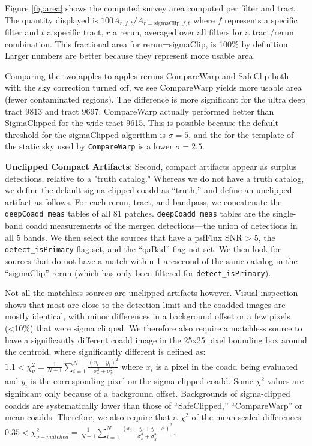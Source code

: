 \documentclass[DM,authoryear,toc]{lsstdoc}
\begin{document}
Figure \ref{fig:area} shows the computed survey area computed per filter and tract.
The quantity displayed is $100A_{r,f,t}/A_{r=\mathrm{sigmaClip}, f,t}$ where $f$ represents a specific filter and $t$ a specific tract, $r$ a rerun, averaged over all filters for a tract/rerun combination.  This fractional area for rerun=sigmaClip, is 100\% by definition. Larger numbers are better because they represent more usable area.

Comparing the two apples-to-apples reruns CompareWarp and SafeClip both with the sky correction turned off, we see CompareWarp yields more usable area (fewer contaminated regions).
The difference is more significant for the ultra deep tract 9813 and tract 9697.
CompareWarp actually performed better than SigmaClipped for the wide tract 9615.
This is possible because the default threshold for the sigmaClipped algorithm is $\sigma=5$, and the for the template of the static sky used by \texttt{CompareWarp} is a lower $\sigma=2.5$.

\textbf{Unclipped Compact Artifacts}: Second, compact artifacts appear as surplus detections, relative to a "truth catalog."
Whereas we do not have a truth catalog, we define the default sigma-clipped coadd as ``truth,'' and define an unclipped artifact as follows.
For each rerun, tract, and bandpass, we concatenate the \texttt{deepCoadd\_meas} tables of all 81 patches.
\texttt{deepCoadd\_meas} tables are the single-band coadd measurements of the merged detections---the union of detections in all 5 bands.
We then select the sources that have a psfFlux SNR > 5, the \texttt{detect\_isPrimary} flag set, and the ``qaBad'' flag not set.
We then look for sources that do not have a match within 1 arcsecond of the same catalog in the ``sigmaClip'' rerun (which has only been filtered for \texttt{detect\_isPrimary}).

Not all the matchless sources are unclipped artifacts however. Visual inspection shows that most are close to the detection limit and the coadded images are mostly identical, with minor differences in a background offset or a few pixels (<10\%)  that were sigma clipped.
We therefore also require a matchless source to have a significantly different coadd image in the 25x25 pixel bounding box around the centroid, where significantly different is defined as:
$1.1 < \chi^2_{\nu} = \frac{1}{N-1}\sum^{N}_{i=1} \frac{{(x_i - y_i)}^2}{\sigma_x^2 + \sigma_y^2}$
where $x_i$ is a pixel in the coadd being evaluated and $y_i$ is the corresponding pixel on the sigma-clipped coadd.
Some $\chi^2$ values are significant only because of a background offset. Backgrounds of sigma-clipped coadds are systematically lower than those of ``SafeClipped,'' ``CompareWarp'' or mean coadds.
Therefore, we also require that a $\chi^2$ of the mean scaled differences:
$0.35 < \chi^2_{\nu-matched} = \frac{1}{N-1}\sum^{N}_{i=1} \frac{{(x_i - y_i  + \bar{y} - \bar{x})}^2}{\sigma_x^2 + \sigma_y^2}$.
\end{document}
